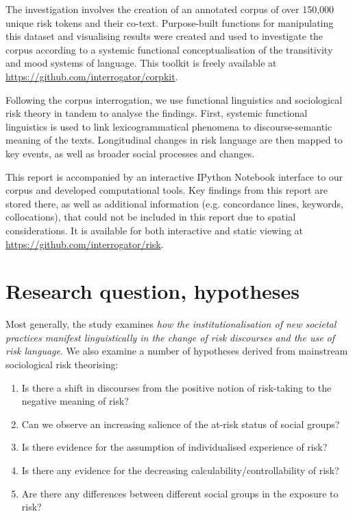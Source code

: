 \documentclass{report}
\begin{document}
The investigation involves the creation of an annotated corpus of over 150,000 unique risk tokens and their co-text. Purpose-built functions for manipulating this dataset and visualising results were created and used to investigate the corpus according to a systemic functional conceptualisation of the transitivity and mood systems of language. This toolkit is freely available at \url{https://github.com/interrogator/corpkit}. 

Following the corpus interrogation, we use functional linguistics and sociological risk theory in tandem to analyse the findings. First, systemic functional linguistics is used to link lexicogrammatical phenomena to discourse-semantic meaning of the texts. Longitudinal changes in risk language are then mapped to key events, as well as broader social processes and changes.

This report is accompanied by an interactive IPython Notebook interface to our corpus and developed computational tools. Key findings from this report are stored there, as well as additional information (e.g. concordance lines, keywords, collocations), that could not be included in this report due to spatial considerations. It is available for both interactive and static viewing at \url{https://github.com/interrogator/risk}.

\section*{Research question, hypotheses} 

Most generally, the study examines \emph{how the institutionalisation of new societal practices manifest linguistically in the change of risk discourses and the use of risk language}. We also examine a number of hypotheses derived from mainstream sociological risk theorising:

\begin{enumerate}
\item Is there a shift in discourses from the positive notion of risk-taking to the negative meaning of risk?
\item Can we observe an increasing salience of the at-risk status of social groups?
\item Is there evidence for the assumption of individualised experience of risk?
\item Is there any evidence for the decreasing calculability/controllability of risk?
\item Are there any differences between different social groups in the exposure to risk?
\end{enumerate}
\end{document}
